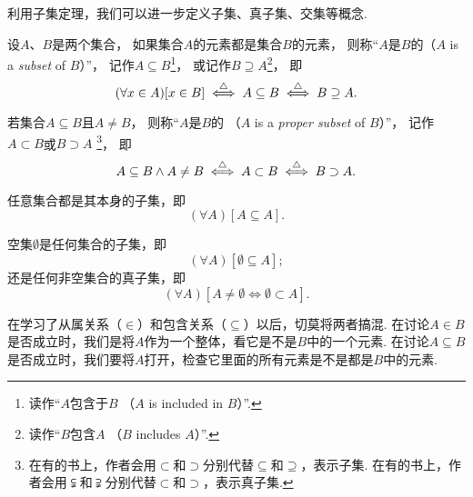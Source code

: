 利用子集定理，我们可以进一步定义子集、真子集、交集等概念.
\begin{definition}\label{definition:集合论.子集的定义}
设\(A\)、\(B\)是两个集合，
如果集合\(A\)的元素都是集合\(B\)的元素，
则称“\(A\)是\(B\)的（\(A\) is a \emph{subset} of \(B\)）”，
记作\(A \subseteq B\)\footnote{读作“\(A\)包含于\(B\)
（\(A\) is included in \(B\)）”.}，
或记作\(B \supseteq A\)\footnote{读作“\(B\)包含\(A\)
（\(B\) includes \(A\)）”.}，
即\begin{equation*}
	(\forall x \in A)[x \in B]
	\overset{\triangle}{\iff}
	A \subseteq B
	\overset{\triangle}{\iff}
	B \supseteq A.
\end{equation*}

若集合\(A \subseteq B\)且\(A \neq B\)，
则称“\(A\)是\(B\)的%
（\(A\) is a \emph{proper subset} of \(B\)）”，
记作\(A \subset B\)或\(B \supset A\)
\footnote{
	在有的书上，作者会用\(\subset\)和\(\supset\)分别代替\(\subseteq\)和\(\supseteq\)，表示子集.
	在有的书上，作者会用\(\subsetneqq\)和\(\supsetneqq\)分别代替\(\subset\)和\(\supset\)，表示真子集.
}，
即\begin{equation*}
	A \subseteq B
	\land
	A \neq B
	\overset{\triangle}{\iff}
	A \subset B
	\overset{\triangle}{\iff}
	B \supset A.
\end{equation*}
\end{definition}

\begin{theorem}
任意集合都是其本身的子集，即\begin{equation*}
	(\forall A)[A \subseteq A].
\end{equation*}
\end{theorem}

\begin{theorem}\label{theorem:子集公理.空集是任何集合的子集}
空集\(\emptyset\)是任何集合的子集，即\begin{equation*}
	(\forall A)[\emptyset \subseteq A];
\end{equation*}
还是任何非空集合的真子集，即\begin{equation*}
	(\forall A)[A \neq \emptyset \iff \emptyset \subset A].
\end{equation*}
\end{theorem}

在学习了从属关系（\(\in\)）和包含关系（\(\subseteq\)）以后，切莫将两者搞混.
在讨论\(A \in B\)是否成立时，我们是将\(A\)作为一个整体，看它是不是\(B\)中的一个元素.
在讨论\(A \subseteq B\)是否成立时，我们要将\(A\)打开，检查它里面的所有元素是不是都是\(B\)中的元素.

